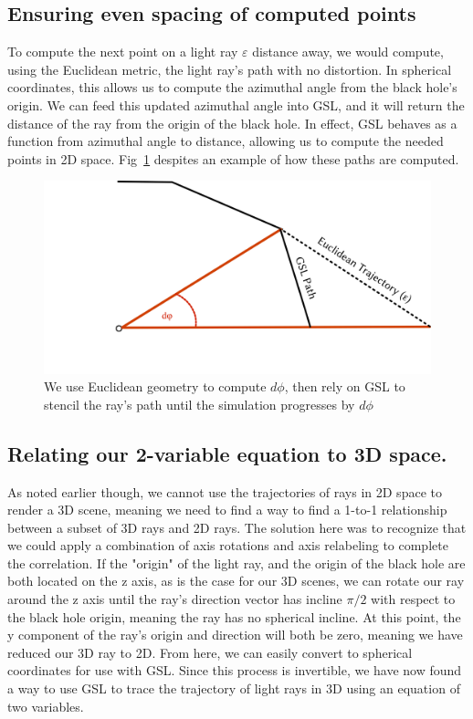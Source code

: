 \subsection{Ensuring even spacing of computed points}
To compute the next point on a light ray $\varepsilon$ distance away, we would compute, using the Euclidean metric, the light ray's path with no distortion. In spherical coordinates, this allows us to compute the azimuthal angle from the black hole's origin. We can feed this updated azimuthal angle into GSL, and it will return the distance of the ray from the origin of the black hole. In effect, GSL behaves as a function from azimuthal angle to distance, allowing us to compute the needed points in 2D space.
Fig~\ref{fig:nextpoint} despites an example of how these paths are computed.

\begin{figure}[h]
  \centering
  \includegraphics[width=.65\linewidth]{figs/nextpoint}
  \caption{We use Euclidean geometry to compute $d\phi$, then rely on GSL to stencil the ray's path until the simulation progresses by $d\phi$}
  \label{fig:nextpoint}
\end{figure}


\subsection{Relating our 2-variable equation to 3D space.}
As noted earlier though, we cannot use the trajectories of rays in 2D space to render a 3D scene, meaning we need to find a way to find a 1-to-1 relationship between a subset of 3D rays and 2D rays. The solution here was to recognize that we could apply a combination of axis rotations and axis relabeling to complete the correlation. If the "origin" of the light ray, and the origin of the black hole are both located on the z axis, as is the case for our 3D scenes, we can rotate our ray around the z axis until the ray's direction vector has incline $ \pi / 2 $ with respect to the black hole origin, meaning the ray has no spherical incline. At this point, the y component of the ray's origin and direction will both be zero, meaning we have reduced our 3D ray to 2D. From here, we can easily convert to spherical coordinates for use with GSL. Since this process is invertible, we have now found a way to use GSL to trace the trajectory of light rays in 3D using an equation of two variables.


